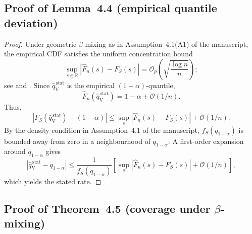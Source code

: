 \documentclass[preprint,11pt,authoryear]{elsarticle}
\newcommand{\1}{\boldsymbol{1}}
\newcommand{\qVstat}{\hat{q}_{\scriptscriptstyle\mathrm{V}}^{\,\mathrm{stat}}}
\begin{document}
\subsection{Proof of Lemma~4.4 (empirical quantile deviation)}
\label{app:lem_quantile}

\begin{proof}
	Under geometric $\beta$-mixing as in Assumption~4.1(A1) of the manuscript,
	the empirical CDF satisfies the uniform concentration bound
	\begin{equation}
		\label{eq:app_ecdf_bound}
		\sup_{s\in\mathbb R}|\hat F_n(s)-F_S(s)|
		=
		\mathcal O_p\!\left(\sqrt{\frac{\log n}{n}}\right);
	\end{equation}
	see \citet[Theorem 2.1]{yu1994rates} and
	\citet[Theorem 7.2]{rio2017asymptotic}.
	 Since $\qVstat$ is the
	empirical $(1-\alpha)$-quantile,
	\[
	\hat F_n(\qVstat)=1-\alpha+\mathcal O(1/n).
	\]
	Thus,
	\[
	|F_S(\qVstat)-(1-\alpha)|
	\le
	\sup_s|\hat F_n(s)-F_S(s)|+\mathcal O(1/n).
	\]
	By the density condition in Assumption~4.1 of the manuscript,
	$f_S(q_{1-\alpha})$ is bounded away from zero in a neighbourhood of
	$q_{1-\alpha}$. A first-order expansion around $q_{1-\alpha}$ gives
	\[
	|\qVstat-q_{1-\alpha}|
	\le
	\frac{1}{f_S(q_{1-\alpha})}
	\left[
	\sup_s|\hat F_n(s)-F_S(s)|+\mathcal O(1/n)
	\right],
	\]
	which yields the stated rate.
\end{proof}

\subsection{Proof of Theorem~4.5 (coverage under $\beta$-mixing)}
\label{app:thm_coverage}
\end{document}
